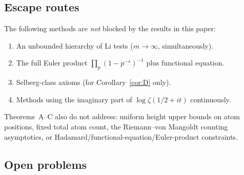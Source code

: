 \documentclass[12pt]{amsart}
\theoremstyle{definition}
\theoremstyle{remark}
\theoremstyle{plain}
\begin{document}
\subsection{Escape routes}

The following methods are \emph{not} blocked by the results in this paper:

\begin{enumerate}
\item An unbounded hierarchy of Li tests ($m \to \infty$, simultaneously).
\item The full Euler product $\prod_p (1-p^{-s})^{-1}$ plus functional equation.
\item Selberg-class axioms (for Corollary~\ref{cor:D} only).
\item Methods using the imaginary part of $\log\zeta(1/2+it)$ continuously.
\end{enumerate}

Theorems~A--C also do not address: uniform height upper bounds on
atom positions, fixed total atom count, the Riemann--von Mangoldt
counting asymptotics, or Hadamard/functional-equation/Euler-product constraints.

\subsection{Open problems}
\end{document}
